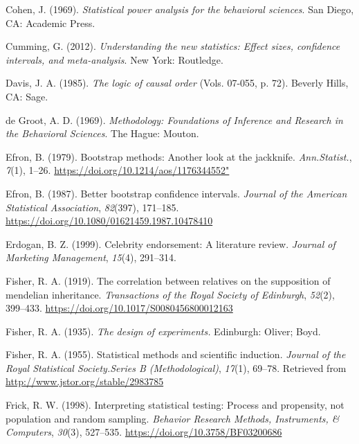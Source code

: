 \documentclass[a4paper]{book}
\theoremstyle{definition}
\theoremstyle{definition}
\theoremstyle{definition}
\theoremstyle{remark}
\begin{document}
\hypertarget{refs}{}
\hypertarget{ref-RefWorks:3933}{}
Cohen, J. (1969). \emph{Statistical power analysis for the behavioral
sciences}. San Diego, CA: Academic Press.

\hypertarget{ref-RefWorks:3883}{}
Cumming, G. (2012). \emph{Understanding the new statistics: Effect
sizes, confidence intervals, and meta-analysis}. New York: Routledge.

\hypertarget{ref-RefWorks:1494}{}
Davis, J. A. (1985). \emph{The logic of causal order} (Vols. 07-055, p.
72). Beverly Hills, CA: Sage.

\hypertarget{ref-deGrootMethodologyFoundationsInference1969}{}
de Groot, A. D. (1969). \emph{Methodology: Foundations of Inference and
Research in the Behavioral Sciences}. The Hague: Mouton.

\hypertarget{ref-RefWorks:3956}{}
Efron, B. (1979). Bootstrap methods: Another look at the jackknife.
\emph{Ann.Statist.}, \emph{7}(1), 1--26.
\href{https://doi.org/10.1214/aos/1176344552\%22}{https://doi.org/10.1214/aos/1176344552"}

\hypertarget{ref-RefWorks:3957}{}
Efron, B. (1987). Better bootstrap confidence intervals. \emph{Journal
of the American Statistical Association}, \emph{82}(397), 171--185.
\url{https://doi.org/10.1080/01621459.1987.10478410}

\hypertarget{ref-RefWorks:3940}{}
Erdogan, B. Z. (1999). Celebrity endorsement: A literature review.
\emph{Journal of Marketing Management}, \emph{15}(4), 291--314.

\hypertarget{ref-RefWorks:3955}{}
Fisher, R. A. (1919). The correlation between relatives on the
supposition of mendelian inheritance. \emph{Transactions of the Royal
Society of Edinburgh}, \emph{52}(2), 399--433.
\url{https://doi.org/10.1017/S0080456800012163}

\hypertarget{ref-RefWorks:3932}{}
Fisher, R. A. (1935). \emph{The design of experiments.} Edinburgh:
Oliver; Boyd.

\hypertarget{ref-RefWorks:3907}{}
Fisher, R. A. (1955). Statistical methods and scientific induction.
\emph{Journal of the Royal Statistical Society.Series B
(Methodological)}, \emph{17}(1), 69--78. Retrieved from
\url{http://www.jstor.org/stable/2983785}

\hypertarget{ref-RefWorks:3925}{}
Frick, R. W. (1998). Interpreting statistical testing: Process and
propensity, not population and random sampling. \emph{Behavior Research
Methods, Instruments, \& Computers}, \emph{30}(3), 527--535.
\url{https://doi.org/10.3758/BF03200686}
\end{document}
